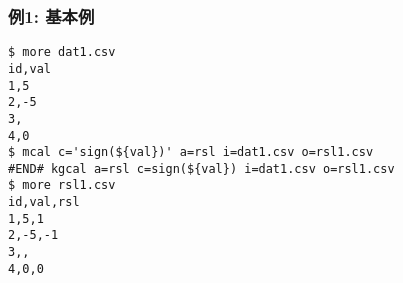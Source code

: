 \subsubsection*{例1: 基本例}



\begin{Verbatim}[baselinestretch=0.7,frame=single]
$ more dat1.csv
id,val
1,5
2,-5
3,
4,0
$ mcal c='sign(${val})' a=rsl i=dat1.csv o=rsl1.csv
#END# kgcal a=rsl c=sign(${val}) i=dat1.csv o=rsl1.csv
$ more rsl1.csv
id,val,rsl
1,5,1
2,-5,-1
3,,
4,0,0
\end{Verbatim}
